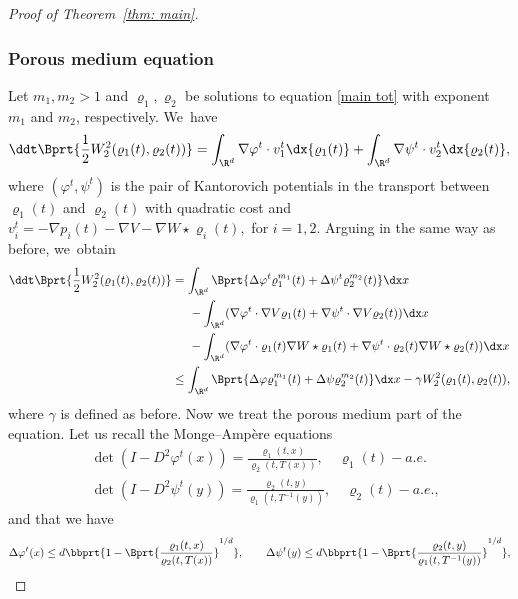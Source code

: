 \begin{proof}[Proof of Theorem~\ref{thm: main}]
\subsubsection*{Porous medium equation}
Let $m_1, m_2>1$ and $\varrho_1, \varrho_2$ be solutions to equation \eqref{main tot} with exponent $m_1$ and $m_2$, respectively. We~have\vspace*{-3pt}
\begin{equation*}
\ddt \Bprt{\frac 12 W_2^2(\varrho_1(t), \varrho_2(t))} = \int_{\R^d} \nabla \varphi^t \cdot v_1^t \dx{\varrho_1(t)} + \int_{\R^d} \nabla \psi^t \cdot v^t_2 \dx{\varrho_2(t)},
\end{equation*}
where $(\varphi^t, \psi^t)$ is the pair of Kantorovich potentials in the transport between $\varrho_1(t)$ and $\varrho_2(t)$ with quadratic cost and $v_i^t = -\nabla p_i(t) - \nabla V - \nabla W \star \varrho_i(t),$ for $i=1,2$.
Arguing in the same way as before, we~obtain\vspace*{-5pt}
\begin{align*}\label{dt W2 pme}
\ddt \Bprt{\frac 12 W_2^2(\varrho_1(t), \varrho_2(t))} &= \int_{\R^d} \Bprt{\Delta \varphi^t \varrho_1^{m_1}(t) +\Delta \psi^t \varrho_2^{m_2}(t) }\dx x\\
&\hspace*{.5cm} - \int_{\R^d} (\nabla \varphi^t \cdot \nabla V \varrho_1(t) + \nabla \psi^t \cdot \nabla V \varrho_2(t)) \dx x\\
&\hspace*{.5cm} - \int_{\R^d} (\nabla \varphi^t \cdot \varrho_1(t)\nabla W\star \varrho_1(t) +\nabla \psi^t \cdot \varrho_2(t)\nabla W\star \varrho_2(t) ) \dx x\\
&\leq \int_{\R^d} \Bprt{\Delta \varphi \varrho_1^{m_1}(t) +\Delta \psi \varrho_2^{m_2}(t) }\dx x -\gamma W_2^2(\varrho_1(t),\varrho_2(t)),
\end{align*}
where $\gamma$ is defined as before.
Now we treat the porous medium part of the equation.
Let us recall the Monge--Ampère equations\vspace*{-3pt}
\begin{align*}
&\det (I - D^2 \varphi^t(x)) = \frac{\varrho_1(t,x)}{\varrho_2(t,T (x))}, \quad \varrho_1(t)-a.e. \\[-3pt]
&\det (I - D^2 \psi^t(y)) = \frac{\varrho_2(t,y)}{\varrho_1(t,T^{-1}(y))}, \quad \varrho_2(t)-a.e.,
\end{align*}
and that we have
\[
\Delta \varphi^t(x)\leq d\bbprt{1-\Bprt{\frac{\varrho_1(t,x)}{\varrho_2(t,T(x))}}^{1/d}}, \qquad\Delta \psi^t(y)\leq d\bbprt{1-\Bprt{\frac{\varrho_2(t,y)}{\varrho_1(t,T^{-1}(y))}}^{1/d}},
\]
\end{proof}
